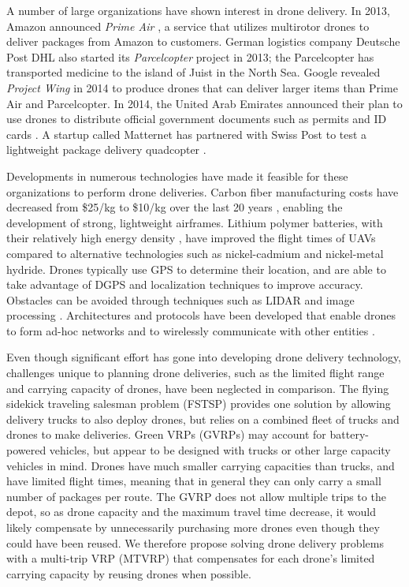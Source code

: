 \documentclass[journal]{IEEEtran}
\begin{document}
A number of large organizations have shown interest in drone delivery. In 2013, Amazon announced \emph{Prime Air} \cite{primeair}, a service that utilizes multirotor drones to deliver packages from Amazon to customers. German logistics company Deutsche Post DHL also started its \emph{Parcelcopter} project in 2013; the Parcelcopter \cite{parcelcopter} has transported medicine to the island of Juist in the North Sea. Google revealed \emph{Project Wing} \cite{projectwing} in 2014 to produce drones that can deliver larger items than Prime Air and Parcelcopter. In 2014, the United Arab Emirates announced their plan to use drones to distribute official government documents such as permits and ID cards \cite{uaedrone}. A startup called Matternet has partnered with Swiss Post to test a lightweight package delivery quadcopter \cite{matternet}.

Developments in numerous technologies have made it feasible for these organizations to perform drone deliveries. Carbon fiber manufacturing costs have decreased from \$25/kg to \$10/kg over the last 20 years \cite{Morgan2005,Reiter2013}, enabling the development of strong, lightweight airframes. Lithium polymer batteries, with their relatively high energy density \cite{Reddy2010}, have improved the flight times of UAVs compared to alternative technologies such as nickel-cadmium and nickel-metal hydride. Drones typically use GPS to determine their location, and are able to take advantage of DGPS \cite{dgps} and localization techniques \cite{karpenko2015} to improve accuracy. Obstacles can be avoided through techniques such as LIDAR \cite{Merz2013} and image processing \cite{Carloni2013}. Architectures and protocols have been developed that enable drones to form ad-hoc networks \cite{Bekmezci2013} and to wirelessly communicate with other entities \cite{Li2013}.

Even though significant effort has gone into developing drone delivery technology, challenges unique to planning drone deliveries, such as the limited flight range and carrying capacity of drones, have been neglected in comparison. The flying sidekick traveling salesman problem (FSTSP) \cite{Murray2015} provides one solution by allowing delivery trucks to also deploy drones, but relies on a combined fleet of trucks and drones to make deliveries. Green VRPs (GVRPs) \cite{Erdogan2012} may account for battery-powered vehicles, but appear to be designed with trucks or other large capacity vehicles in mind. Drones have much smaller carrying capacities than trucks, and have limited flight times, meaning that in general they can only carry a small number of packages per route. The GVRP does not allow multiple trips to the depot, so as drone capacity and the maximum travel time decrease, it would likely compensate by unnecessarily purchasing more drones even though they could have been reused. We therefore propose solving drone delivery problems with a multi-trip VRP (MTVRP) \cite{Taillard1995} that compensates for each drone's limited carrying capacity by reusing drones when possible.
\end{document}
